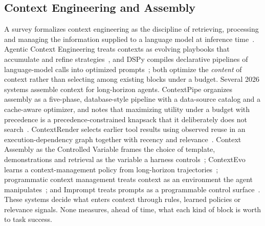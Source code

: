 
\subsection{Context Engineering and Assembly}
A survey formalizes context engineering as the discipline of retrieving, processing and managing the information supplied
to a language model at inference time~\citep{cesurvey2025}. Agentic Context Engineering treats contexts as evolving
playbooks that accumulate and refine strategies~\citep{ace2025}, and DSPy compiles declarative pipelines of language-model
calls into optimized prompts~\citep{dspy2023}; both optimize the \emph{content} of context rather than selecting among
existing blocks under a budget. Several 2026 systems assemble context for long-horizon agents. ContextPipe organizes
assembly as a five-phase, database-style pipeline with a data-source catalog and a cache-aware optimizer, and notes that
maximizing utility under a budget with precedence is a precedence-constrained knapsack that it deliberately does not
search~\citep{contextpipe2026}. ContextRender selects earlier tool results using observed reuse in an execution-dependency
graph together with recency and relevance~\citep{contextrender2026}. Context Assembly as the Controlled Variable frames the
choice of template, demonstrations and retrieval as the variable a harness controls~\citep{controlledvar2026}; ContextEvo
learns a context-management policy from long-horizon trajectories~\citep{contextevo2026}; programmatic context management
treats context as an environment the agent manipulates~\citep{ctxenv2026}; and Imprompt treats prompts as a programmable
control surface~\citep{imprompt2026}. These systems decide what enters context through rules, learned policies or
relevance signals. None measures, ahead of time, what each kind of block is worth to task success.

